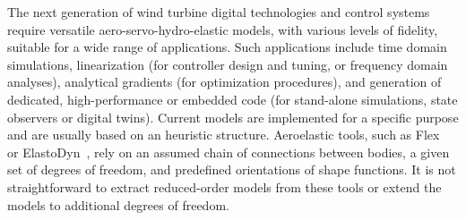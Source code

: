 \documentclass[wes, manuscript]{copernicus}
\renewcommand{\v}[1]{\boldsymbol{#1}}
\begin{document}


\introduction 

The next generation of wind turbine digital technologies and control systems require versatile aero-servo-hydro-elastic
models, with various levels of fidelity, suitable for a wide range of applications. 
Such applications include time domain simulations, linearization (for controller design and tuning, or frequency domain analyses), analytical gradients (for optimization procedures), and generation of dedicated, high-performance or embedded code (for stand-alone simulations, state observers or digital twins). 
Current models are implemented for a specific purpose and are usually based on an heuristic structure.
Aeroelastic tools, such as Flex~\citep{flexoye,branlard:2019flex} or ElastoDyn~\citep{OpenFAST}, rely on an assumed chain of connections between bodies, a given set of degrees of freedom, and predefined orientations of shape functions. It is not straightforward to extract reduced-order models from these tools or extend the models to additional degrees of freedom.
\end{document}

